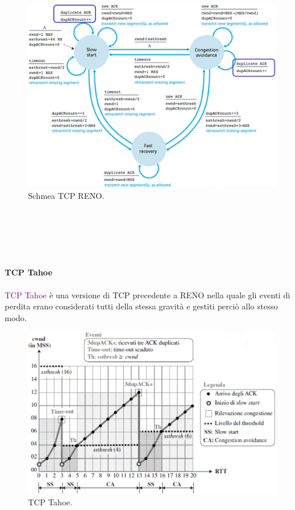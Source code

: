 \begin{figure}
    \centering
    \includegraphics[scale=0.30]{Immagini/TCPRENOScheme.png}
    \caption{Schmea TCP RENO.}
\end{figure}

\newblock\\\\\\\\
\paragraph{TCP Tahoe}
\textcolor{purple}{TCP Tahoe} è una versione di TCP precedente a RENO nella quale gli eventi di perdita erano considerati tutti della stessa gravità e gestiti perciò allo stesso modo.
\begin{figure}[h]
    \centering
    \includegraphics[scale=0.24]{Immagini/TCPTahoe.png}
    \caption{TCP Tahoe.}
\end{figure}

